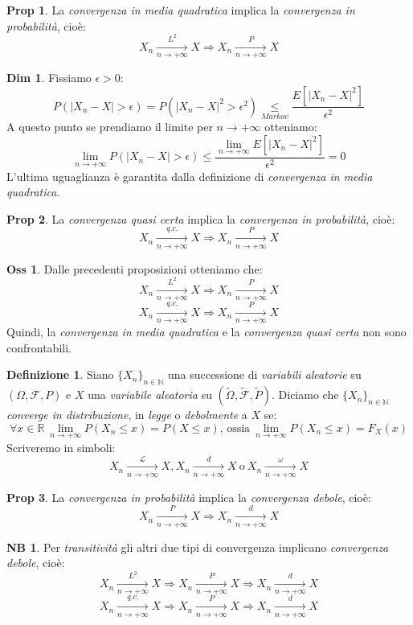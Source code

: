 \documentclass[12pt, a4paper]{report}
\theoremstyle{definition}
\newtheorem{definition}{Definizione}[section]
\newtheorem*{demonstration}{Dim}
\newtheorem*{proposition}{Prop}
\newtheorem*{observation}{Oss}
\newtheorem*{note}{NB}
\DeclareRobustCommand{\F}{\mathcal{F}}%
\DeclareRobustCommand{\R}{\mathbb{R}}%
\DeclareRobustCommand{\N}{\mathbb{N}}%
\DeclareRobustCommand{\probspace}{(\Omega,\F,P)}
\newcommand\underrel[2]{\mathrel{\mathop{#2}\limits_{#1}}}%
\newcommand\conv[2]{\xrightarrow[#2\to +\infty]{#1}}
\begin{document}
\begin{proposition}
	La \emph{convergenza in media quadratica} implica la \emph{convergenza in
	probabilità}, cioè:
	\[X_n\conv{L^2}{n}X\Rightarrow X_n\conv{P}{n}X\]
\end{proposition}
\begin{demonstration}
	Fissiamo $\epsilon>0$:
	\[P(|X_n-X|>\epsilon)=P(|X_n-X|^2>\epsilon^2)\underrel{Markov}{\leq}
	\frac{E\left[|X_n-X|^2\right]}{\epsilon^2}\]
	A questo punto se prendiamo il limite per \(n\to +\infty\) otteniamo:
	\[\lim_{n\to +\infty}P(|X_n-X|>\epsilon)\leq\frac{\lim_{n\to +\infty}E\left[
	|X_n-X|^2\right]}{\epsilon^2}=0\]
	L'ultima uguaglianza è garantita dalla definizione di \emph{convergenza in
	media quadratica}.
\end{demonstration}

\begin{proposition}
	La \emph{convergenza quasi certa} implica la \emph{convergenza in probabilità},
	cioè:
	\[X_n\conv{q.c.}{n}X\Rightarrow X_n\conv{P}{n}X\]
\end{proposition}

\begin{observation}
	Dalle precedenti proposizioni otteniamo che:
	\[X_n\conv{L^2}{n}X\Rightarrow X_n\conv{P}{n}X\]
	\[X_n\conv{q.c.}{n}X\Rightarrow X_n\conv{P}{n}X\]
	Quindi, la \emph{convergenza in media quadratica} e la \emph{convergenza
	quasi certa} non sono confrontabili.
\end{observation}

\begin{definition}
	Siano \(\{X_n\}_{n\in\N}\) una successione di \emph{variabili aleatorie} su
	$\probspace$ e $X$ una \emph{variabile aleatoria} su \((\tilde{\Omega},\tilde{\F},
	\tilde{P})\). Diciamo che \(\{X_n\}_{n\in\N}\) \emph{converge in distribuzione},
	in \emph{legge} o \emph{debolmente} a $X$ se:
	\[\forall x\in\R\ \lim_{n\to +\infty}P(X_n\leq x)=P(X\leq x)\text{, ossia}\ 
	\lim_{n\to +\infty}P(X_n\leq x)=F_X(x)\]
	Scriveremo in simboli:
	\[X_n\conv{\mathcal{L}}{n}X, X_n\conv{d}{n}X\ \text{o}\ X_n\conv{\omega}
	{n}X\]
\end{definition}

\begin{proposition}
	La \emph{convergenza in probabilità} implica la \emph{convergenza debole},
	cioè:
	\[X_n\conv{P}{n}X\Rightarrow X_n\conv{d}{n}X\]
\end{proposition}
\begin{note}
	Per \emph{transitività} gli altri due tipi di convergenza implicano
	\emph{convergenza debole}, cioè:
	\[X_n\conv{L^2}{n}X\Rightarrow X_n\conv{P}{n}X\Rightarrow X_n\conv{d}{n}X\]
	\[X_n\conv{q.c.}{n}X\Rightarrow X_n\conv{P}{n}X\Rightarrow X_n\conv{d}{n}X\]
\end{note}
\end{document}
